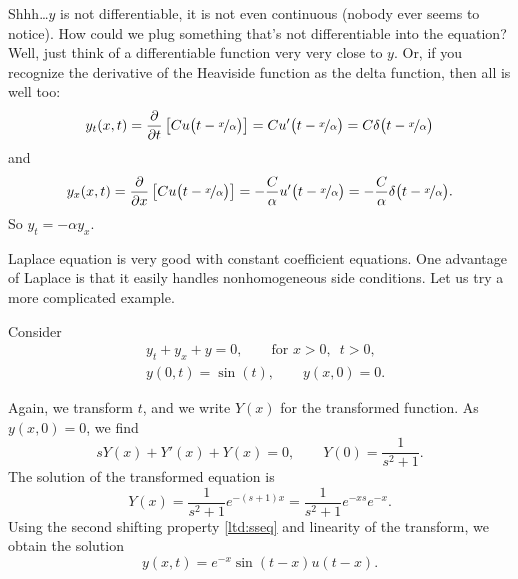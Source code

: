 \begin{example}
Shhh\ldots $y$ is not differentiable, it is not even continuous
(nobody ever seems to notice).  How could we plug something that's not
differentiable into the equation?
Well, just think of a differentiable function very very close to $y$.
Or, if you recognize the derivative of the Heaviside function as the delta
function, then all is well too:
\begin{equation*}
y_t (x,t) = \frac{\partial}{\partial t} \left[
C  u\bigl(t-\nicefrac{x}{\alpha}\bigr)
\right]
=
C  u'\bigl(t-\nicefrac{x}{\alpha}\bigr)
=
C \delta\bigl(t-\nicefrac{x}{\alpha}\bigr)
\end{equation*}
and
\begin{equation*}
y_x (x,t) = \frac{\partial}{\partial x} \left[
C  u\bigl(t-\nicefrac{x}{\alpha}\bigr)
\right]
=
- \frac{C}{\alpha}  u'\bigl(t-\nicefrac{x}{\alpha}\bigr)
=
- \frac{C}{\alpha} \delta\bigl(t-\nicefrac{x}{\alpha}\bigr) .
\end{equation*}
So $y_t = - \alpha y_x$.
\end{example}

Laplace equation is very good with constant coefficient equations.  One
advantage of Laplace is that it easily handles
nonhomogeneous side conditions.
Let us try a more complicated example.

\begin{example}
Consider
\begin{align*}
& y_t + y_x + y = 0, \qquad \text{for } x > 0, \enspace t > 0,
\\
& y(0,t) = \sin(t), \qquad y(x,0) = 0 .
\end{align*}

Again, we transform $t$, and we write $Y(x)$ for the
transformed function.  As $y(x,0) = 0$, we find
\begin{equation*}
sY(x) + Y'(x) + Y(x) = 0, \qquad 
Y(0) = \frac{1}{s^2+1} .
\end{equation*}
The solution of the transformed equation is
\begin{equation*}
Y(x) =
\frac{1}{s^2+1} e^{-(s+1) x}
=
\frac{1}{s^2+1} e^{-xs}
e^{-x}
.
\end{equation*}
Using the second shifting property \eqref{ltd:sseq}
and linearity of the transform,
we obtain the solution
\begin{equation*}
y(x,t) 
=
e^{-x}
\sin(t-x)
u(t-x) .
\end{equation*}
\end{example}

